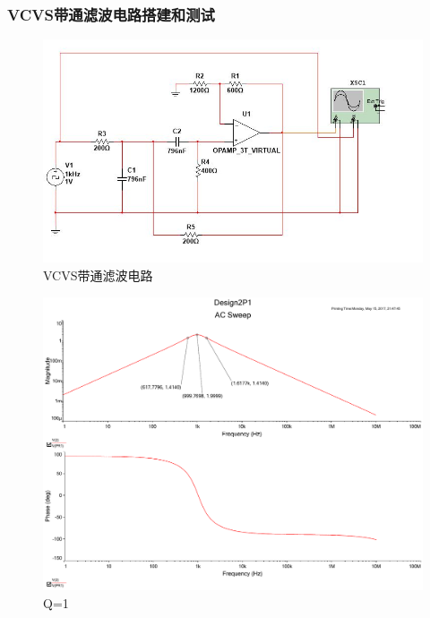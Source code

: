 \documentclass[UTF8,a4paper]{paper}
\begin{document}
\subsubsection{VCVS带通滤波电路搭建和测试}
\begin{figure}
\centering
\includegraphics[width=\textwidth]{P.jpg}
\caption{VCVS带通滤波电路}
\label{P}
\end{figure}
\begin{figure}
\centering
\includegraphics[width=\textwidth]{2P1.pdf}
\caption{Q=1}
\label{LQ1}
\end{figure}
\end{document}
